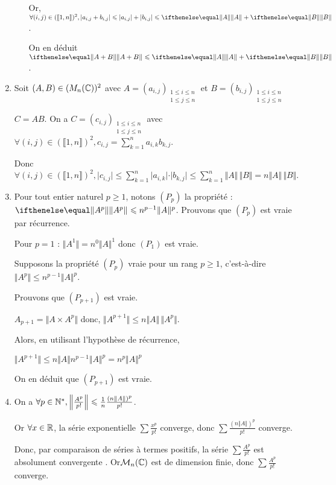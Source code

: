 \begin{enumerate}
\begin{enumerate}
        Or, $\forall (i,j)\in(\entiers{1}{n})^2, \vert a_{i,j} + b_{i,j} \vert \leqslant \vert a_{i,j}\vert + \vert b_{i,j}\vert\leqslant\norme{A}{} + \norme{B}{}$.
        
        On en déduit $\norme{A+B}{} \leqslant \norme{A}{} + \norme{B}{}$.
    \end{enumerate}

    \item Soit $(A,B)\in(M_n(\mathbb{C}))^2$ avec $A=(a_{i,j})_{\substack{1\leqslant i\leqslant n \\ 1 \leqslant j \leqslant n}}$ et  $B=(b_{i,j})_{\substack{1\leqslant i\leqslant n \\ 1 \leqslant j \leqslant n}}$
    
    $C=AB$. On a $C=(c_{i,j})_{\substack{1\leqslant i\leqslant n \\ 1 \leqslant j \leqslant n}}$ avec $\forall (i,j) \in(\llbracket 1,n \rrbracket)^2,c_{i,j}=\sum\limits_{k=1}^na_{i,k}b_{k,j}$.
    
    Donc $\forall (i,j) \in(\llbracket 1,n \rrbracket)^2,\vert c_{i,j} \vert \leqslant \sum\limits_{k=1}^n\vert a_{i,k}\vert\cdot\vert b_{k,j}\vert \leqslant \sum\limits_{k=1}^n \Vert A \Vert\, \Vert B \Vert = n \Vert A \Vert\, \Vert B \Vert$.

    \item Pour tout entier naturel $p \geqslant 1$, notons $(P_p)$ la propriété : $\norme{A^p}{} \leqslant n^{p-1} \Vert A \Vert^p$.
    Prouvons que $(P_p)$ est vraie par récurrence.
    
Pour $p = 1$ : $\Vert A^1\Vert = n^0\Vert A \Vert^1$ donc $(P_1)$ est vraie.

Supposons la propriété $(P_p)$ vraie pour un rang $p \geqslant 1$, c'est-à-dire $\Vert A^p\Vert \leqslant n^{p-1} \Vert A \Vert^p$.

Prouvons que $(P_{p+1})$ est vraie. 

$A_{p+1} = \Vert A \times A^p \Vert$ donc, $\Vert A^{p+1} \Vert \leqslant n \Vert A \Vert \, \Vert A^p\Vert$.

Alors, en utilisant l’hypothèse de récurrence,

$\Vert A^{p+1}\Vert \leqslant n \Vert A \Vert n^{p-1} \Vert A \Vert^p = n^p\Vert A\Vert^p$

On en déduit que $(P_{p+1})$ est vraie.

    \item On a $\forall p\in\mathbb{N}^*,\left\Vert \frac{A^p}{p!}\right\Vert \leqslant \frac{1}{n} \frac{(n\Vert A \Vert)^p}{p!}$.
    
    Or $\forall x\in\mathbb{R}$, la série exponentielle $\sum \frac{x^p}{p!}$ converge, donc $\sum \frac{(n\Vert A \Vert)^p}{p!}$ converge.
    
    Donc, par comparaison de séries à termes positifs, la série $\sum\frac{A^p}{p!}$ est absolument convergente . Or$\mathcal{M}_n(\mathbb{C})$ est de dimension finie, donc $\sum\frac{A^p}{p!}$ converge.
\end{enumerate}

